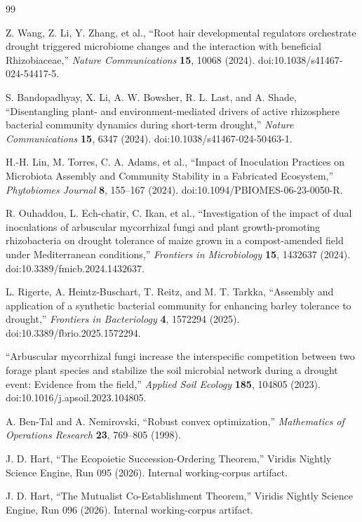 \documentclass[10pt,twocolumn]{article}
\begin{document}
\begin{thebibliography}{99}

Z. Wang, Z. Li, Y. Zhang, et al., ``Root hair developmental regulators
orchestrate drought triggered microbiome changes and the interaction with
beneficial Rhizobiaceae,'' \emph{Nature Communications} \textbf{15}, 10068
(2024). doi:10.1038/s41467-024-54417-5.

S. Bandopadhyay, X. Li, A. W. Bowsher, R. L. Last, and A. Shade,
``Disentangling plant- and environment-mediated drivers of active rhizosphere
bacterial community dynamics during short-term drought,'' \emph{Nature
Communications} \textbf{15}, 6347 (2024).
doi:10.1038/s41467-024-50463-1.

H.-H. Lin, M. Torres, C. A. Adams, et al., ``Impact of Inoculation Practices on
Microbiota Assembly and Community Stability in a Fabricated Ecosystem,''
\emph{Phytobiomes Journal} \textbf{8}, 155--167 (2024).
doi:10.1094/PBIOMES-06-23-0050-R.

R. Ouhaddou, L. Ech-chatir, C. Ikan, et al., ``Investigation of the impact of
dual inoculations of arbuscular mycorrhizal fungi and plant growth-promoting
rhizobacteria on drought tolerance of maize grown in a compost-amended field
under Mediterranean conditions,'' \emph{Frontiers in Microbiology}
\textbf{15}, 1432637 (2024). doi:10.3389/fmicb.2024.1432637.

L. Rigerte, A. Heintz-Buschart, T. Reitz, and M. T. Tarkka, ``Assembly and
application of a synthetic bacterial community for enhancing barley tolerance
to drought,'' \emph{Frontiers in Bacteriology} \textbf{4}, 1572294 (2025).
doi:10.3389/fbrio.2025.1572294.

``Arbuscular mycorrhizal fungi increase the interspecific competition between
two forage plant species and stabilize the soil microbial network during a
drought event: Evidence from the field,'' \emph{Applied Soil Ecology}
\textbf{185}, 104805 (2023). doi:10.1016/j.apsoil.2023.104805.

A. Ben-Tal and A. Nemirovski, ``Robust convex optimization,''
\emph{Mathematics of Operations Research} \textbf{23}, 769--805 (1998).

J. D. Hart, ``The Ecopoietic Succession-Ordering Theorem,'' Viridis Nightly
Science Engine, Run 095 (2026). Internal working-corpus artifact.

J. D. Hart, ``The Mutualist Co-Establishment Theorem,'' Viridis Nightly Science
Engine, Run 096 (2026). Internal working-corpus artifact.

\end{thebibliography}
\end{document}
